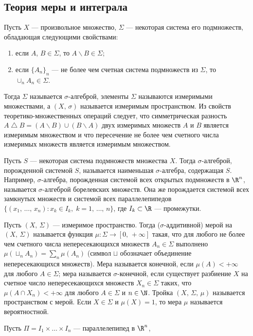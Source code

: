 \documentclass[a4paper
]{article}
\begin{document}
\subsection{Теория меры и интеграла}
Пусть $X$ --- произвольное множество, $\Sigma$ --- некоторая система
его подмножеств, обладающая следующими свойствами:
\begin{enumerate}
\item если $A$, $B\in \Sigma$, то $A\backslash B\in \Sigma$;
\item если $\{A_n\}_n$ --- не более чем счетная система подмножеств
из $\Sigma$, то $\cup_n A_n\in \Sigma$.
\end{enumerate}
Тогда $\Sigma$ называется $\sigma$-алгеброй, элементы $\Sigma$
называются измеримыми множествами, а $(X, \, \sigma)$
называется измеримым пространством. Из свойств теоретико-множественных
операций следует, что симметрическая разность $A\bigtriangleup B=
(A\backslash B)\cup (B\backslash A)$ двух измеримых множеств
$A$ и $B$ является измеримым множеством и что пересечение не более
чем счетного числа измеримых множеств является измеримым множеством. \par
Пусть $S$ --- некоторая система подмножеств множества $X$.
Тогда $\sigma$-алгеброй, порожденной системой $S$, называется
наименьшая $\sigma$-алгебра, содержащая $S$. Например, $\sigma$-алгебра,
порожденная системой всех открытых подмножеств в $\R^n$, называется
$\sigma$-алгеброй борелевских множеств. Она же порождается
системой всех замкнутых множеств и системой всех параллелепипедов
$\{(x_1, \, \dots, \, x_n):x_k\in I_k, \; k=1, \, \dots, \, n\}$,
где $I_k\subset \R$ --- промежутки. \par
Пусть $(X, \, \Sigma)$ --- измеримое пространство. Тогда
($\sigma$-аддитивной) мерой на $(X, \, \Sigma)$ называется функция
$\mu:\Sigma\rightarrow [0, \, +\infty]$ такая, что для любого не более
чем счетного числа непересекающихся множеств $A_n\in \Sigma$ выполнено
$\mu(\sqcup_n A_n)=\sum_n \mu(A_n)$ (символ $\sqcup$ обозначает
объединение непересекающихся множеств). Мера называется конечной,
если $\mu(A)<+\infty$ для любого $A\in \Sigma$; мера называется
$\sigma$-конечной, если существует разбиение $X$ на счетное число
непересекающихся множеств $X_n\in \Sigma$ таких, что $\mu (A\cap X_n)
<+\infty$ для любого $A\in \Sigma$ и $n\in \N$. Тройка $(X, \,
\Sigma, \, \mu)$ называется пространством с мерой. Если
$X\in \Sigma$ и $\mu(X)=1$, то мера $\mu$ называется вероятностной. \par
Пусть $\Pi=I_1\times \dots\times I_n$ --- параллелепипед в $\R^n$,
\end{document}
